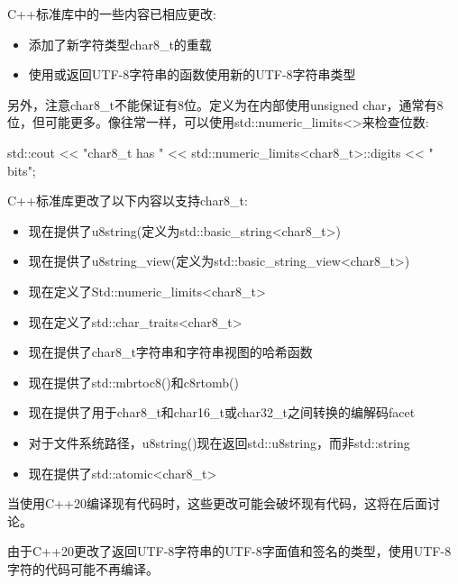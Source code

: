 C++标准库中的一些内容已相应更改:

\begin{itemize}
\item
添加了新字符类型char8\_t的重载

\item
使用或返回UTF-8字符串的函数使用新的UTF-8字符串类型
\end{itemize}

另外，注意char8\_t不能保证有8位。定义为在内部使用unsigned char，通常有8位，但可能更多。像往常一样，可以使用std::numeric\_limits<>来检查位数:

\begin{cpp}
std::cout << "char8_t has "
		  << std::numeric_limits<char8_t>::digits << " bits\n";
\end{cpp}


C++标准库更改了以下内容以支持char8\_t:

\begin{itemize}
\item
现在提供了u8string(定义为std::basic\_string<char8\_t>)

\item
现在提供了u8string\_view(定义为std::basic\_string\_view<char8\_t>)

\item
现在定义了Std::numeric\_limits<char8\_t>

\item
现在定义了std::char\_traits<char8\_t>

\item
现在提供了char8\_t字符串和字符串视图的哈希函数

\item
现在提供了std::mbrtoc8()和c8rtomb()

\item
现在提供了用于char8\_t和char16\_t或char32\_t之间转换的编解码facet

\item
对于文件系统路径，u8string()现在返回std::u8string，而非std::string

\item
现在提供了std::atomic<char8\_t>
\end{itemize}

当使用C++20编译现有代码时，这些更改可能会破坏现有代码，这将在后面讨论。


由于C++20更改了返回UTF-8字符串的UTF-8字面值和签名的类型，使用UTF-8字符的代码可能不再编译。


